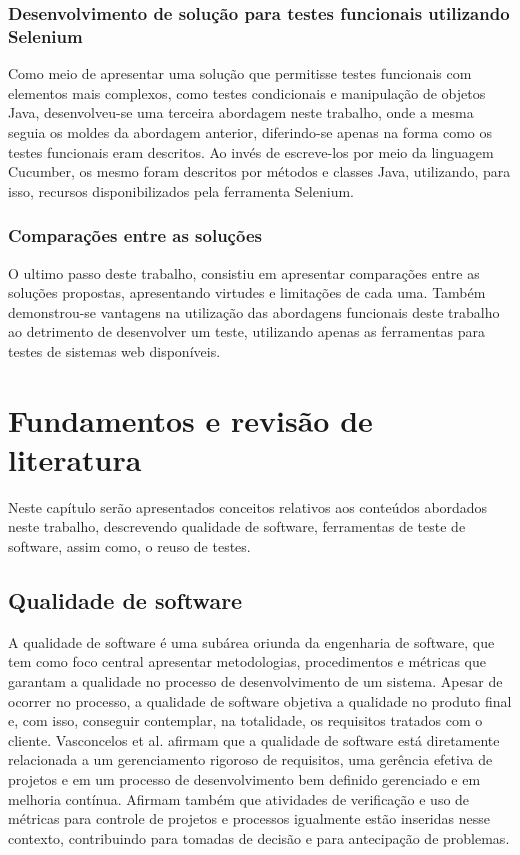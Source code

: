 \documentclass[tg]{mdtufsm}
\begin{document}
\subsection{Desenvolvimento de solução para testes funcionais utilizando Selenium}
Como meio de apresentar uma solução que permitisse testes funcionais com elementos mais complexos, como testes condicionais e manipulação de objetos Java, desenvolveu-se
uma terceira abordagem neste trabalho, onde a mesma seguia os moldes da abordagem anterior, diferindo-se apenas na forma como os testes funcionais eram descritos. Ao invés de
escreve-los por meio da linguagem Cucumber, os mesmo foram descritos por métodos e classes Java, utilizando, para isso, recursos disponibilizados pela ferramenta Selenium.

\subsection{Comparações entre as soluções}
O ultimo passo deste trabalho, consistiu em apresentar comparações entre as soluções propostas, apresentando virtudes e limitações de cada uma. Também demonstrou-se
vantagens na utilização das abordagens funcionais deste trabalho ao detrimento de desenvolver um teste, utilizando apenas as ferramentas para testes de sistemas web disponíveis.

\chapter{Fundamentos e revisão de literatura}

Neste capítulo serão apresentados conceitos relativos aos conteúdos abordados neste trabalho, descrevendo qualidade de software, ferramentas de teste de software, assim como, o reuso de testes.

\section{Qualidade de software}

A qualidade de software é uma subárea oriunda da engenharia de software, que tem como foco central apresentar metodologias,
procedimentos e métricas que garantam a qualidade no processo de desenvolvimento de um sistema. Apesar de ocorrer no processo, a qualidade de software
objetiva a qualidade no produto final e, com isso, conseguir contemplar, na totalidade, os requisitos tratados com o cliente.
Vasconcelos et al. \citeyearpar{de2006introduccao} afirmam que a qualidade de software está diretamente relacionada a um gerenciamento
rigoroso de requisitos, uma gerência efetiva de projetos e em um processo de desenvolvimento bem definido gerenciado e em melhoria contínua. Afirmam também que atividades de verificação e uso de métricas para controle de projetos e processos igualmente estão inseridas nesse contexto, contribuindo para tomadas de
decisão e para antecipação de problemas.
\end{document}
